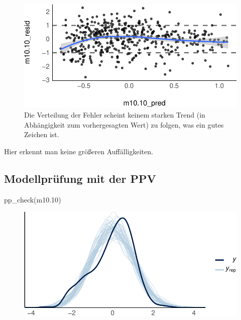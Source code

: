 \documentclass[
  a4paper,
  DIV=11]{scrreprt}
\newenvironment{Shaded}{\begin{snugshade}}{\end{snugshade}}
\newcommand{\FloatTok}[1]{\textcolor[rgb]{0.68,0.00,0.00}{#1}}
\newcommand{\FunctionTok}[1]{\textcolor[rgb]{0.28,0.35,0.67}{#1}}
\newcommand{\NormalTok}[1]{\textcolor[rgb]{0.00,0.23,0.31}{#1}}
\theoremstyle{definition}
\theoremstyle{remark}
\begin{document}
\begin{figure}[H]

{\centering \includegraphics{./metrische-AV_files/figure-pdf/fig-kidiqresiduum-1.pdf}

}

\caption{\label{fig-kidiqresiduum}Die Verteilung der Fehler scheint
keinem starken Trend (in Abhängigkeit zum vorhergesagten Wert) zu
folgen, was ein gutes Zeichen ist.}

\end{figure}

Hier erkennt man keine größeren Auffälligkeiten.

\hypertarget{modellpruxfcfung-mit-der-ppv}{%
\subsection{Modellprüfung mit der
PPV}\label{modellpruxfcfung-mit-der-ppv}}

\begin{Shaded}
\begin{Highlighting}[]
\FunctionTok{pp\_check}\NormalTok{(m10}\FloatTok{.10}\NormalTok{)}
\end{Highlighting}
\end{Shaded}

\begin{figure}[H]

{\centering \includegraphics{./metrische-AV_files/figure-pdf/m10-10-pp-check-1.pdf}

}

\end{figure}
\end{document}
